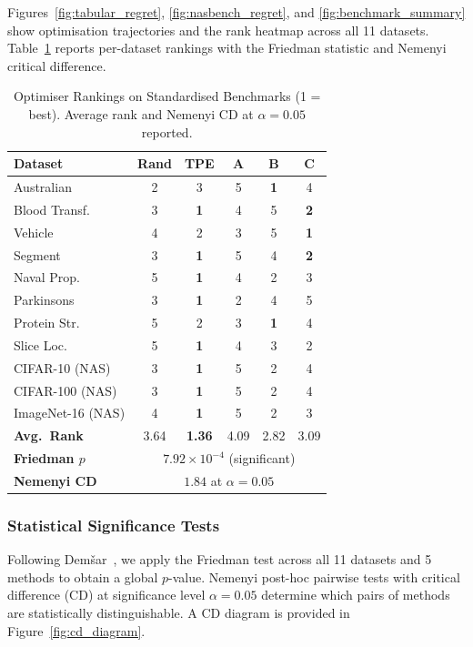 Figures~\ref{fig:tabular_regret}, \ref{fig:nasbench_regret}, and \ref{fig:benchmark_summary} show optimisation trajectories and the rank heatmap across all 11 datasets. Table~\ref{tab:hpobench_rankings} reports per-dataset rankings with the Friedman statistic and Nemenyi critical difference.

\begin{table}[H]
\centering
\caption{Optimiser Rankings on Standardised Benchmarks (1 = best). Average rank and Nemenyi CD at $\alpha=0.05$ reported.}
\label{tab:hpobench_rankings}
\begin{tabular}{lccccc}
\toprule
\textbf{Dataset} & \textbf{Rand} & \textbf{TPE} & \textbf{A} & \textbf{B} & \textbf{C} \\
\midrule
Australian         & 2 & 3 & 5 & \textbf{1} & 4 \\
Blood Transf.      & 3 & \textbf{1} & 4 & 5 & \textbf{2} \\
Vehicle            & 4 & 2 & 3 & 5 & \textbf{1} \\
Segment            & 3 & \textbf{1} & 5 & 4 & \textbf{2} \\
\midrule
Naval Prop.        & 5 & \textbf{1} & 4 & 2 & 3 \\
Parkinsons         & 3 & \textbf{1} & 2 & 4 & 5 \\
Protein Str.       & 5 & 2 & 3 & \textbf{1} & 4 \\
Slice Loc.         & 5 & \textbf{1} & 4 & 3 & 2 \\
\midrule
CIFAR-10 (NAS)     & 3 & \textbf{1} & 5 & 2 & 4 \\
CIFAR-100 (NAS)    & 3 & \textbf{1} & 5 & 2 & 4 \\
ImageNet-16 (NAS)  & 4 & \textbf{1} & 5 & 2 & 3 \\
\midrule
\textbf{Avg.\ Rank} & 3.64 & \textbf{1.36} & 4.09 & 2.82 & 3.09 \\
\textbf{Friedman $p$} & \multicolumn{5}{c}{$7.92\times10^{-4}$ (significant)} \\
\textbf{Nemenyi CD} & \multicolumn{5}{c}{$1.84$ at $\alpha=0.05$} \\
\bottomrule
\end{tabular}
\end{table}

\subsubsection{Statistical Significance Tests}
\label{subsec:stats}

Following Dem\v{s}ar~\cite{demsar2006}, we apply the Friedman test across all 11 datasets and 5 methods to obtain a global $p$-value. Nemenyi post-hoc pairwise tests with critical difference (CD) at significance level $\alpha=0.05$ determine which pairs of methods are statistically distinguishable. A CD diagram is provided in Figure~\ref{fig:cd_diagram}.

